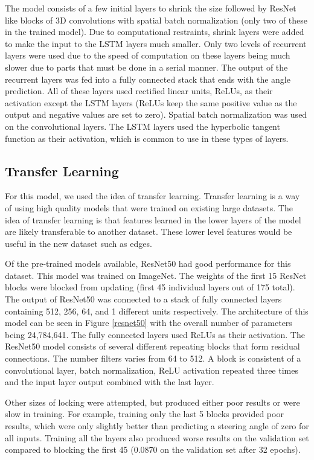 \documentclass[10pt,twocolumn,letterpaper]{article}
\begin{document}
The model consists of a few initial layers to shrink the size followed by ResNet like blocks of 3D convolutions with spatial batch normalization (only two of these in the trained model). Due to computational restraints, shrink layers were added to make the input to the LSTM layers much smaller. Only two levels of recurrent layers were used due to the speed of computation on these layers being much slower due to parts that must be done in a serial manner. The output of the recurrent layers was fed into a fully connected stack that ends with the angle prediction. All of these layers used rectified linear units, ReLUs, as their activation except the LSTM layers (ReLUs keep the same positive value as the output and negative values are set to zero). Spatial batch normalization was used on the convolutional layers. The LSTM layers used the hyperbolic tangent function as their activation, which is common to use in these types of layers.


\subsection{Transfer Learning}
For this model, we used the idea of transfer learning. Transfer learning is a way of using high quality models that were trained on existing large datasets. The idea of transfer learning is that features learned in the lower layers of the model are likely transferable to another dataset. These lower level features would be useful in the new dataset such as edges.

Of the pre-trained models available, ResNet50 had good performance for this dataset. This model was trained on ImageNet. The weights of the first 15 ResNet blocks were blocked from updating (first 45 individual layers out of 175 total). The output of ResNet50 was connected to a stack of fully connected layers containing 512, 256, 64, and 1 different units respectively. The architecture of this model can be seen in Figure \ref{resnet50} with the overall number of parameters being 24,784,641. The fully connected layers used ReLUs as their activation. The ResNet50 model consists of several different repeating blocks that form residual connections. The number filters varies from 64 to 512. A block is consistent of a convolutional layer, batch normalization, ReLU activation repeated three times and the input layer output combined with the last layer.

Other sizes of locking were attempted, but produced either poor results or were slow in training. For example, training only the last 5 blocks provided poor results, which were only slightly better than predicting a steering angle of zero for all inputs. Training all the layers also produced worse results on the validation set compared to blocking the first 45 (0.0870 on the validation set after 32 epochs). 
\end{document}
